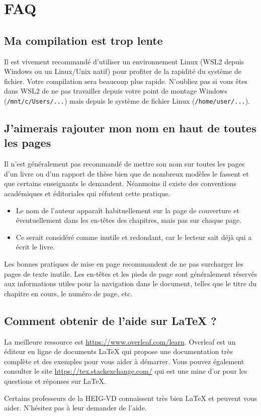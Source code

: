 \chapter{FAQ}

\section{Ma compilation est trop lente}

Il est vivement recommandé d'utiliser un environnement Linux (WSL2 depuis Windows ou un Linux/Unix natif) pour profiter de la rapidité du système de fichier. Votre compilation sera beaucoup plus rapide. N'oubliez pas si vous êtes dans WSL2 de ne pas travailler depuis votre point de montage Windows (\verb!/mnt/c/Users/...!) mais depuis le système de fichier Linux (\verb!/home/user/...!).

\section{J'aimerais rajouter mon nom en haut de toutes les pages}

Il n'est généralement pas recommandé de mettre son nom sur toutes les pages d'un livre ou d'un rapport de thèse bien que de nombreux modèles le fassent et que certains enseignants le demandent. Néanmoins il existe des conventions académiques et éditoriales qui réfutent cette pratique.

\begin{itemize}
    \item Le nom de l'auteur apparaît habituellement sur la page de couverture et éventuellement dans les en-têtes des chapitres, mais pas sur chaque page.
    \item Ce serait considéré comme inutile et redondant, car le lecteur sait déjà qui a écrit le livre.
\end{itemize}

Les bonnes pratiques de mise en page recommandent de ne pas surcharger les pages de texte inutile. Les en-têtes et les pieds de page sont généralement réservés aux informations utiles pour la navigation dans le document, telles que le titre du chapitre en cours, le numéro de page, etc.

\section{Comment obtenir de l'aide sur LaTeX ?}

La meilleure ressource est \url{https://www.overleaf.com/learn}. Overleaf est un éditeur en ligne de documents LaTeX qui propose une documentation très complète et des exemples pour vous aider à démarrer. Vous pouvez également consulter le site \url{https://tex.stackexchange.com/} qui est une mine d'or pour les questions et réponses sur LaTeX.

Certains professeurs de la HEIG-VD connaissent très bien LaTeX et peuvent vous aider. N'hésitez pas à leur demander de l'aide.
